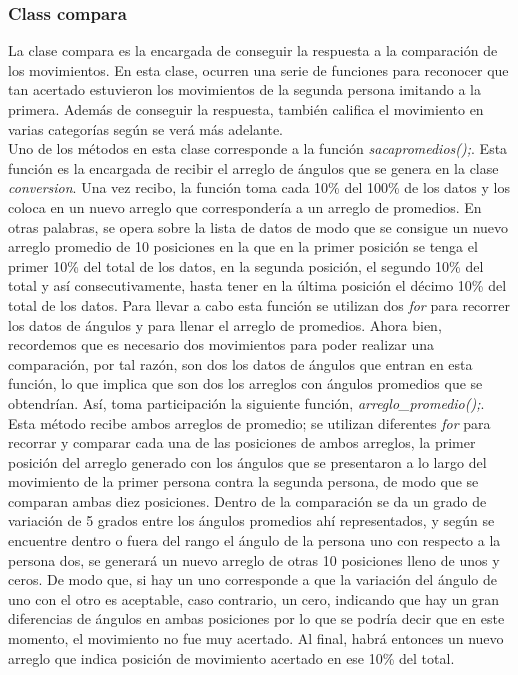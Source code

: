 \documentclass[letterpaper]{article}
\begin{document}
\subsubsection{Class compara}

\quad \quad La clase compara es la encargada de conseguir la respuesta a la comparación de los movimientos. En esta clase, ocurren una serie de funciones para reconocer que tan acertado estuvieron los movimientos de la segunda persona 
imitando a la primera. Además de conseguir la respuesta, también califica el movimiento en varias categorías según se verá más adelante.\\

Uno de los métodos en esta clase corresponde a la función \textit{sacapromedios();}. Esta función es la encargada de recibir el arreglo de ángulos que se genera en la clase \textit{conversion}. Una vez recibo, la función toma cada 10\% del 100\% de los datos y los coloca en un nuevo arreglo 
que correspondería a un arreglo de promedios. En otras palabras, se opera sobre la lista de datos de modo que se consigue un nuevo arreglo promedio de 10 posiciones en la que en la primer posición se tenga el primer 10\% del total de los datos, en la segunda posición, el segundo 10\% del total y así consecutivamente, hasta tener en la última posición el décimo 10\% del total de los datos.
Para llevar a cabo esta función se utilizan dos \textit{for} para recorrer los datos de ángulos y para llenar el arreglo de promedios. Ahora bien, recordemos que es necesario dos movimientos para poder realizar una comparación, por tal razón, son dos los datos de ángulos que entran en esta función, lo que implica que son dos los arreglos con ángulos promedios que se obtendrían. Así, toma participación
la siguiente función, \textit{arreglo\_promedio();}. Esta método recibe ambos arreglos de promedio; se utilizan diferentes \textit{for} para recorrar y comparar cada una de las posiciones de ambos arreglos, la primer posición del arreglo generado con los ángulos que se presentaron a lo largo del movimiento de la primer persona contra la segunda persona, de modo que se comparan ambas diez posiciones. Dentro de la comparación
se da un grado de variación de 5 grados entre los ángulos promedios ahí representados, y según se encuentre dentro o fuera del rango el ángulo de la persona uno con respecto a la persona dos, se generará un nuevo arreglo de otras 10 posiciones lleno de unos y ceros. De modo que, si hay un uno corresponde a que la variación del ángulo de uno con el otro es aceptable, caso contrario, un cero, indicando que hay un gran diferencias de ángulos en ambas posiciones
por lo que se podría decir que en este momento, el movimiento no fue muy acertado. Al final, habrá entonces un nuevo arreglo que indica posición de movimiento acertado en ese 10\%  del total.\\
\end{document}

